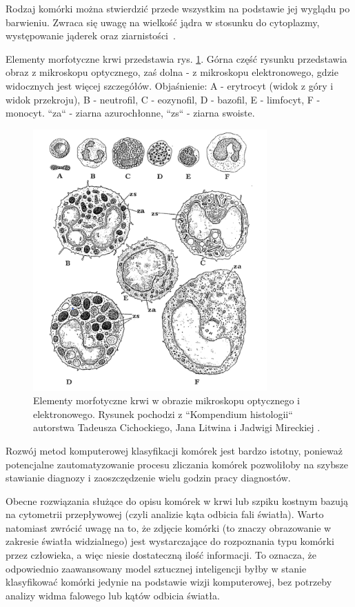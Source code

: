 Rodzaj komórki można stwierdzić przede wszystkim na podstawie jej wyglądu po barwieniu.
Zwraca się uwagę na wielkość jądra w stosunku do cytoplazmy, występowanie jąderek oraz ziarnistości~\cite{histology}.

Elementy morfotyczne krwi przedstawia rys. \ref{fig:electron_microscope}.
Górna część rysunku przedstawia obraz z mikroskopu optycznego, zaś dolna - z mikroskopu elektronowego, gdzie widocznych jest więcej szczegółów.
Objaśnienie: A - erytrocyt (widok z góry i widok przekroju), B - neutrofil, C - eozynofil, D - bazofil, E - limfocyt, F - monocyt. “za“ - ziarna azurochłonne, “zs“
- ziarna swoiste.

\begin{figure}
    \centering
    \includegraphics[width=0.8\textwidth]{morfotyczne}
    \caption{Elementy morfotyczne krwi w obrazie mikroskopu optycznego i elektronowego. Rysunek pochodzi z “Kompendium histologii“ autorstwa Tadeusza Cichockiego, Jana Litwina i Jadwigi Mireckiej \cite{histology}.}
    \label{fig:electron_microscope}
\end{figure}

Rozwój metod komputerowej klasyfikacji komórek jest bardzo istotny, ponieważ potencjalne zautomatyzowanie procesu zliczania komórek pozwoliłoby na szybsze stawianie diagnozy i zaoszczędzenie wielu godzin pracy diagnostów.

Obecne rozwiązania służące do opisu komórek w krwi lub szpiku kostnym bazują na cytometrii przepływowej (czyli analizie kąta odbicia fali światła).
Warto natomiast zwrócić uwagę na to, że zdjęcie komórki (to znaczy obrazowanie w zakresie światła widzialnego) jest wystarczające do rozpoznania typu komórki przez człowieka, a więc niesie dostateczną ilość informacji.
To oznacza, że odpowiednio zaawansowany model sztucznej inteligencji byłby w stanie klasyfikować komórki jedynie na podstawie wizji komputerowej, bez potrzeby analizy widma falowego lub kątów odbicia światła.


